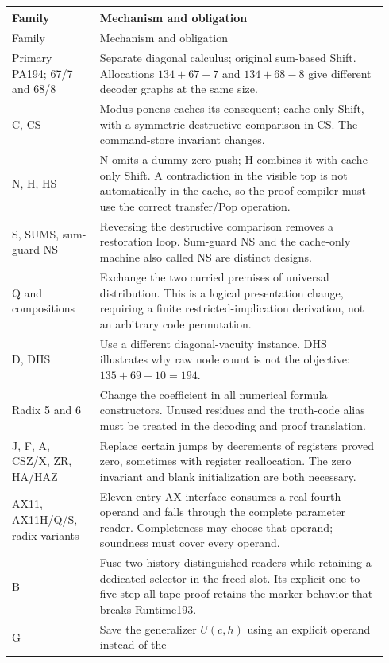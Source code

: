 \documentclass[10pt,letterpaper]{article}
\begin{document}
\begin{longtable}{@{}p{0.22\linewidth}p{0.72\linewidth}@{}}
\toprule Family & Mechanism and obligation\\\midrule\endfirsthead
\toprule Family & Mechanism and obligation\\\midrule\endhead
Primary PA194; 67/7 and 68/8 & Separate diagonal calculus; original sum-based
Shift. Allocations $134+67-7$ and $134+68-8$ give different decoder graphs
at the same size.\\[4pt]
C, CS & Modus ponens caches its consequent; cache-only Shift, with a
symmetric destructive comparison in CS. The command-store invariant changes.\\[4pt]
N, H, HS & N omits a dummy-zero push; H combines it with cache-only Shift.
A contradiction in the visible top is not automatically in the cache, so
the proof compiler must use the correct transfer/Pop operation.\\[4pt]
S, SUMS, sum-guard NS & Reversing the destructive comparison removes a
restoration loop. Sum-guard NS and the cache-only machine also called NS
are distinct designs.\\[4pt]
Q and compositions & Exchange the two curried premises of universal
distribution. This is a logical presentation change, requiring a finite
restricted-implication derivation, not an arbitrary code permutation.\\[4pt]
D, DHS & Use a different diagonal-vacuity instance. DHS illustrates why
raw node count is not the objective: $135+69-10=194$.\\[4pt]
Radix 5 and 6 & Change the coefficient in all numerical formula constructors.
Unused residues and the truth-code alias must be treated in the decoding and
proof translation.\\[4pt]
J, F, A, CSZ/X, ZR, HA/HAZ & Replace certain jumps by decrements of registers
proved zero, sometimes with register reallocation. The zero invariant and
blank initialization are both necessary.\\[4pt]
AX11, AX11H/Q/S, radix variants & Eleven-entry AX interface consumes a real
fourth operand and falls through the complete parameter reader. Completeness
may choose that operand; soundness must cover every operand.\\[4pt]
B & Fuse two history-distinguished readers while retaining a dedicated
selector in the freed slot. Its explicit one-to-five-step all-tape proof
retains the marker behavior that breaks Runtime193.\\[4pt]
G & Save the generalizer $U(c,h)$ using an explicit operand instead of the

\end{longtable}
\end{document}

